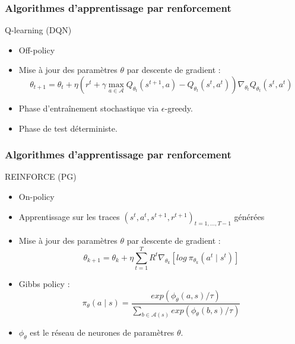 \documentclass[smaller]{beamer}
\begin{document}

\begin{frame}
  \frametitle{Algorithmes d'apprentissage par renforcement}

  \begin{block}{Q-learning (DQN)}
    \begin{itemize}
    \item Off-policy
    \item Mise à jour des paramètres $\theta$ par descente de gradient :\\
      \begin{displaymath}
        \theta_{t+1}    =    \theta_t    +  \eta  \left(r^t    +    \gamma
          \operatorname*{max}\limits_{a        \in        \mathcal{A}}
          Q_{\theta_t}(s^{t+1},a)  -  Q_{\theta_t}(s^t,a^t)\right)
        \nabla_{\theta_t} Q_{\theta_t}(s^t,a^t)
      \end{displaymath}
    \item Phase d'entraînement stochastique via $\epsilon$-greedy.
    \item Phase de test déterministe.
    \end{itemize}
  \end{block}
  
\end{frame}


\begin{frame}
  \frametitle{Algorithmes d'apprentissage par renforcement}

  \begin{block}{REINFORCE (PG)}
    \begin{itemize}
    \item On-policy
    \item  Apprentissage   sur  les  traces  $(s^t,   a^t,  s^{t+1},
      r^{t+1})_{t=1,\ldots,T-1}$ générées
    \item Mise à jour des paramètres $\theta$ par descente de gradient :\\
      \begin{displaymath}
        \theta_{k+1}    =   \theta_k    +   \eta    \sum^T_{t=1}   R^t
        \nabla_{\theta_k} [log\ \pi_{\theta_k}(a^t \mid s^t)]
      \end{displaymath}
    \item Gibbs policy :
      \begin{displaymath}
        \pi_\theta(a              \mid               s)              =
        \frac{exp(\phi_\theta(a,s)/\tau)}{\sum_{b \in \mathcal{A}(s)}exp(\phi_\theta(b,s)/\tau)}
      \end{displaymath}
    \item $\phi_\theta$ est le réseau de neurones de paramètres $\theta$.
    \end{itemize}
  \end{block}

\end{frame}
\end{document}
